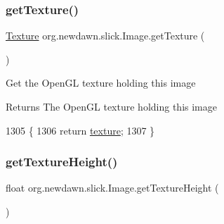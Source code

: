 \mbox{\label{classorg_1_1newdawn_1_1slick_1_1_image_a9c033386a3dcbb5e2f2ae2354e06d5bd}} 
\subsubsection{\texorpdfstring{get\+Texture()}{getTexture()}}
{\footnotesize\ttfamily \mbox{\hyperlink{interfaceorg_1_1newdawn_1_1slick_1_1opengl_1_1_texture}{Texture}} org.\+newdawn.\+slick.\+Image.\+get\+Texture (\begin{DoxyParamCaption}{ }\end{DoxyParamCaption})\hspace{0.3cm}{\ttfamily [inline]}}

Get the Open\+GL texture holding this image

\begin{DoxyReturn}{Returns}
The Open\+GL texture holding this image 
\end{DoxyReturn}

\begin{DoxyCode}
1305                                 \{
1306         \textcolor{keywordflow}{return} \mbox{\hyperlink{classorg_1_1newdawn_1_1slick_1_1_image_a9fd9ddb21247305c83ac4e37d9d51f79}{texture}};
1307     \}
\end{DoxyCode}
\mbox{\label{classorg_1_1newdawn_1_1slick_1_1_image_affb1fb7e0c29174983204c39cfb1af30}} 
\subsubsection{\texorpdfstring{get\+Texture\+Height()}{getTextureHeight()}}
{\footnotesize\ttfamily float org.\+newdawn.\+slick.\+Image.\+get\+Texture\+Height (\begin{DoxyParamCaption}{ }\end{DoxyParamCaption})\hspace{0.3cm}{\ttfamily [inline]}}

